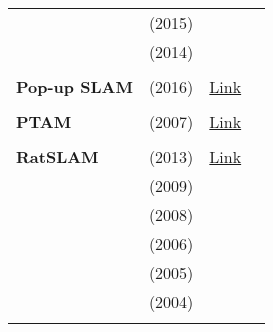 \documentclass[a4paper,12pt]{scrartcl}
\begin{document}
{\begin{longtable}{l|l|l|l}
                           & \cite{Mur-Artal2015} (2015)       &                                                                    &                       \\
                           & \cite{Mur-Artal2014} (2014)       &                                                                    &                       \\
                           &                                   &                                                                    &                       \\
    \textbf{Pop-up SLAM}   & \cite{Yang2016} (2016)            & {\href{https://github.com/shichaoy/pop_up_image}{Link}}            &                       \\
                           &                                   &                                                                    &                       \\
    \textbf{PTAM}          & \cite{Klein2007} (2007)           & {\href{https://github.com/Oxford-PTAM/PTAM-GPL}{Link}}             &                       \\
                           &                                   &                                                                    &                       \\
    \textbf{RatSLAM}       & \cite{Ball2013} (2013)            & {\href{https://github.com/davidmball/ratslam}{Link}}               &                       \\
                           & \cite{Maddern2009} (2009)         &                                                                    &                       \\
                           & \cite{Milford2008} (2008)         &                                                                    &                       \\
                           & \cite{Milford2006} (2006)         &                                                                    &                       \\
                           & \cite{Milford2005} (2005)         &                                                                    &                       \\
                           & \cite{Milford2004} (2004)         &                                                                    &                       \\
                           &                                   &                                                                    &                       \\

\end{longtable}}
\end{document}

